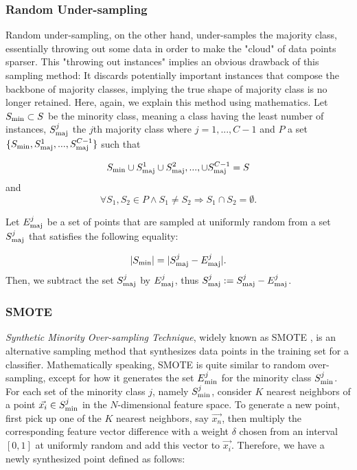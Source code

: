 \documentclass{article}
\begin{document}
	\subsubsection{Random Under-sampling}
	Random under-sampling, on the other hand, under-samples the majority class, essentially throwing out some data in order to make the "cloud" of data points sparser. This "throwing out instances" implies an obvious drawback of this sampling method: It discards potentially important instances that compose the backbone of majority classes, implying the true shape of majority class is no longer retained. Here, again, we explain this method using mathematics. Let $S_{\rm{min}} \subset S$ be the minority class, meaning a class having the least number of instances, $S_{\rm{maj}}^{j}$ the $j$th majority class where $j = 1,...,C-1$ and $P$ a set $\{S_{\rm{min}}, S_{\rm{maj}}^{1},...,S_{\rm{maj}}^{C-1} \}$ such that

	\begin{equation}
	S_{\rm{min}} \cup S_{\rm{maj}}^{1} \cup S_{\rm{maj}}^{2},..., \cup S_{\rm{maj}}^{C-1} = S
	\end{equation}
	and
	\begin{equation}
	\forall S_1,S_2 \in P \land S_1 \neq S_2 \Rightarrow S_1 \cap S_2 = \emptyset.
	\end{equation}
	
Let $E_{\rm{maj}}^j$ be a set of points that are sampled at uniformly random from a set $S_{\rm{maj}}^{j}$ that satisfies the following equality:

	\begin{equation}
	|S_{\rm{min}}| = | S_{\rm{maj}}^j -  E_{\rm{maj}}^j |.
	\end{equation}
Then, we subtract the set $S_{\rm{maj}}^j$ by $E_{\rm{maj}}^j$, thus $S_{\rm{maj}}^j := S_{\rm{maj}}^j -  E_{\rm{maj}}^j$.
		
		\subsubsection{SMOTE}
		\textit{Synthetic Minority Over-sampling Technique}, widely known as SMOTE \cite{SMOTE}, is an alternative sampling method that synthesizes data points in the training set for a classifier. Mathematically speaking, SMOTE is quite similar to random over-sampling, except for how it generates the set $E_{\rm{min}}^j$ for the minority class $S_{\rm{min}}^j$. For each set of the minority class $j$, namely $S_{\rm{min}}^j$, consider $K$ nearest neighbors of a point $\vec{x_i} \in S_{\rm{min}}^j$ in the $N$-dimensional feature space. To generate a new point, first pick up one of the $K$ nearest neighbors, say $\vec{x_{n}}$, then multiply the corresponding feature vector difference with a weight  $\delta$  chosen from an interval $ [0,1]$ at uniformly random and add this vector to $\vec{x_i}$. Therefore, we have a newly synthesized point defined as follows:
		
\end{document}
